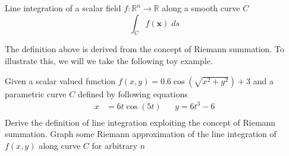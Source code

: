 \documentclass[../../main.tex]{subfiles}
\begin{document}
	
	\begin{definition}\label{def: scalar line integration}
		Line integration of a scalar field $f: \mathbb{R}^n \rightarrow \mathbb{R}$ along a smooth curve $C$
		\begin{equation}
			\int_C f(\mathbf{x}) \; ds
		\end{equation}
	\end{definition}
				
	\par The definition above is derived from the concept of Riemann summation. To illustrate this, we will we take the following toy example.
	
	\begin{example}
		Given a scalar valued function $f(x, y) = 0.6\cos \left ( \sqrt{x^2+y^2} \right ) + 3$ and a parametric curve $C$ defined by following equations 
		\begin{align*}
			x &= 6t \cos(5t)		&&y = 6t^3 - 6\\
		\end{align*}
		Derive the definition of line integration exploiting the concept of Riemann summation. Graph some Riemann approximation of the line integration of $f(x, y)$ along curve $C$ for arbitrary $n$
	\end{example}
\end{document}

